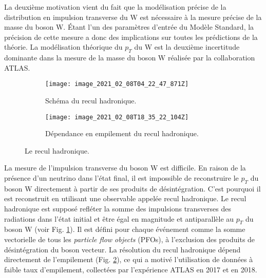 La deuxième motivation vient du fait que la modélisation précise de la distribution en impulsion transverse du W est nécessaire à la mesure précise de la masse du boson W. Étant l'un des paramètres d'entrée du Modèle Standard, la précision de cette mesure a donc des implications sur toutes les prédictions de la théorie. La modélisation théorique du $p_T$ du W est la deuxième incertitude dominante dans la mesure de la masse du boson W réalisée par la collaboration ATLAS.

\begin{figure}[htbp]
	\begin{subfigure}[t]{0.48\textwidth}
		\texttt{[image: image\_2021\_02\_08T04\_22\_47\_871Z]}
		\caption[Hadronic recoil]{Schéma du recul hadronique.}
		\label{fig::hr_s}
	\end{subfigure}
	\hfill
	\begin{subfigure}[t]{0.48\textwidth}
		\texttt{[image: image\_2021\_02\_08T18\_35\_22\_104Z]}
		\caption[Pile-up dependence]{Dépendance en empilement du recul hadronique.}
		\label{fig::hr_pileup_s}
	\end{subfigure}
	\label{fig::hr_sss}
	\caption[The hadronic recoil plots]{Le recul hadronique.}
\end{figure}
La mesure de l'impulsion transverse du boson W est difficile. En raison de la présence d'un neutrino dans l'état final, il est impossible de reconstruire le $p_T$ du boson W directement à partir de ses produits de désintégration. C'est pourquoi il est reconstruit en utilisant une observable appelée recul hadronique. Le recul hadronique est supposé refléter la somme des impulsions transverses des radiations dans l'état initial et être égal en magnitude et antiparallèle au $p_T$ du boson W  (voir Fig. \ref{fig::hr_s}). Il est défini pour chaque événement comme la somme vectorielle de tous les \textit{particle flow objects} (PFOs), à l'exclusion des produits de désintégration du boson vecteur. La résolution du recul hadronique dépend directement de l'empilement (Fig. \ref{fig::hr_pileup_s}), ce qui a motivé l'utilisation de données à faible taux d'empilement, collectées par l'expérience ATLAS en 2017 et en 2018.

